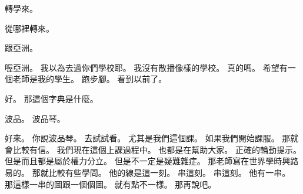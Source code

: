 \hypertarget{c01:cue:2187}{}轉學來。

\hypertarget{c01:cue:2188}{}從哪裡轉來。

\hypertarget{c01:cue:2189}{}跟亞洲。

\hypertarget{c01:cue:2190}{}喔亞洲。
\hypertarget{c01:cue:2191}{}我以為去過你們學校耶。
\hypertarget{c01:cue:2192}{}我沒有散播像樣的學校。
\hypertarget{c01:cue:2193}{}真的嗎。
\hypertarget{c01:cue:2194}{}希望有一個老師是我的學生。
\hypertarget{c01:cue:2195}{}跑步腳。
\hypertarget{c01:cue:2196}{}看到以前了。

\hypertarget{c01:cue:2197}{}好。
\hypertarget{c01:cue:2198}{}那這個字典是什麼。

\hypertarget{c01:cue:2199}{}波品。
\hypertarget{c01:cue:2200}{}波品琴。

\hypertarget{c01:cue:2201}{}好來。
\hypertarget{c01:cue:2202}{}你說波品琴。
\hypertarget{c01:cue:2203}{}去試試看。
\hypertarget{c01:cue:2204}{}尤其是我們這個課。
\hypertarget{c01:cue:2205}{}如果我們開始課服。
\hypertarget{c01:cue:2206}{}那就會比較有信。
\hypertarget{c01:cue:2207}{}我們現在這個上課過程中。
\hypertarget{c01:cue:2208}{}也都是在幫助大家。
\hypertarget{c01:cue:2209}{}正確的輪動提示。
\hypertarget{c01:cue:2210}{}但是而且都是屬於權力分立。
\hypertarget{c01:cue:2211}{}但是不一定是疑難雜症。
\hypertarget{c01:cue:2212}{}那老師寫在世界學時興路易的。
\hypertarget{c01:cue:2213}{}那就比較有些學問。
\hypertarget{c01:cue:2214}{}他的線是這一刻。
\hypertarget{c01:cue:2215}{}串這刻。
\hypertarget{c01:cue:2216}{}串這刻。
\hypertarget{c01:cue:2217}{}他有一串。
\hypertarget{c01:cue:2218}{}那這樣一串的圖跟一個個圖。
\hypertarget{c01:cue:2219}{}就有點不一樣。
\hypertarget{c01:cue:2220}{}那再說吧。

